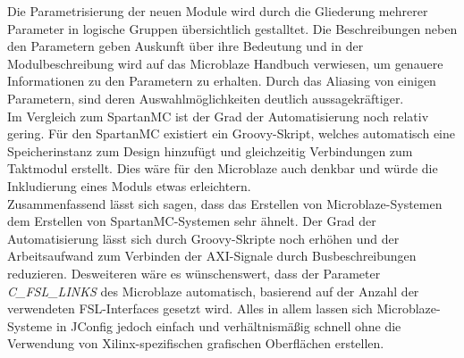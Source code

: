 Die Parametrisierung der neuen Module wird durch die Gliederung mehrerer Parameter in logische Gruppen übersichtlich gestalltet. Die Beschreibungen neben den Parametern geben Auskunft über ihre Bedeutung und in der Modulbeschreibung wird auf das Microblaze Handbuch verwiesen, um genauere Informationen zu den Parametern zu erhalten. Durch das Aliasing von einigen Parametern, sind deren Auswahlmöglichkeiten deutlich aussagekräftiger.\\
Im Vergleich zum SpartanMC ist der Grad der Automatisierung noch relativ gering. Für den SpartanMC existiert ein Groovy-Skript, welches automatisch eine Speicherinstanz zum Design hinzufügt und gleichzeitig Verbindungen zum Taktmodul erstellt. Dies wäre für den Microblaze auch denkbar und würde die Inkludierung eines Moduls etwas erleichtern.\\
Zusammenfassend lässt sich sagen, dass das Erstellen von Microblaze-Systemen dem Erstellen von SpartanMC-Systemen sehr ähnelt. Der Grad der Automatisierung lässt sich durch Groovy-Skripte noch erhöhen und der Arbeitsaufwand zum Verbinden der AXI-Signale durch Busbeschreibungen reduzieren. Desweiteren wäre es wünschenswert, dass der Parameter \textit{C\_FSL\_LINKS} des Microblaze automatisch, basierend auf der Anzahl der verwendeten FSL-Interfaces gesetzt wird. Alles in allem lassen sich Microblaze-Systeme in JConfig jedoch einfach und verhältnismäßig schnell ohne die Verwendung von Xilinx-spezifischen grafischen Oberflächen erstellen.
